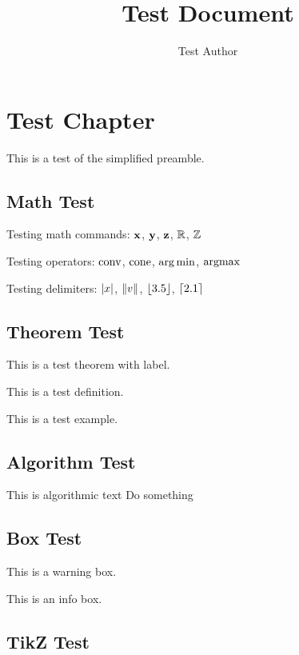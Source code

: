 \documentclass[12pt]{book}
\title{Test Document}
\author{Test Author}
\begin{document}
\maketitle

\chapter{Test Chapter}

This is a test of the simplified preamble.

\section{Math Test}

Testing math commands: $\mathbf{x}$, $\mathbf{y}$, $\mathbf{z}$, $\mathbb{R}$, $\mathbb{Z}$

Testing operators: $\textup{conv}$, $\textup{cone}$, $\operatorname{arg\,min}$, $\mbox{argmax}$

Testing delimiters: $\left\lvert x\right\rvert$, $\left\lVert v\right\rVert$, $\lfloor 3.5 \rfloor$, $\lceil 2.1 \rceil$

\section{Theorem Test}

\begin{theorem}
This is a test theorem with label.
\label{thm:test}
\end{theorem}

\begin{definition}
This is a test definition.
\end{definition}

\begin{example}
This is a test example.
\end{example}

\section{Algorithm Test}

\begin{algorithm}
\begin{algorithmic}
\State This is algorithmic text
\State Do something
\EndIf
\end{algorithmic}
\end{algorithm}

\section{Box Test}

\begin{warn}
This is a warning box.
\end{warn}

\begin{info}
This is an info box.
\end{info}

\section{TikZ Test}

\end{document}
